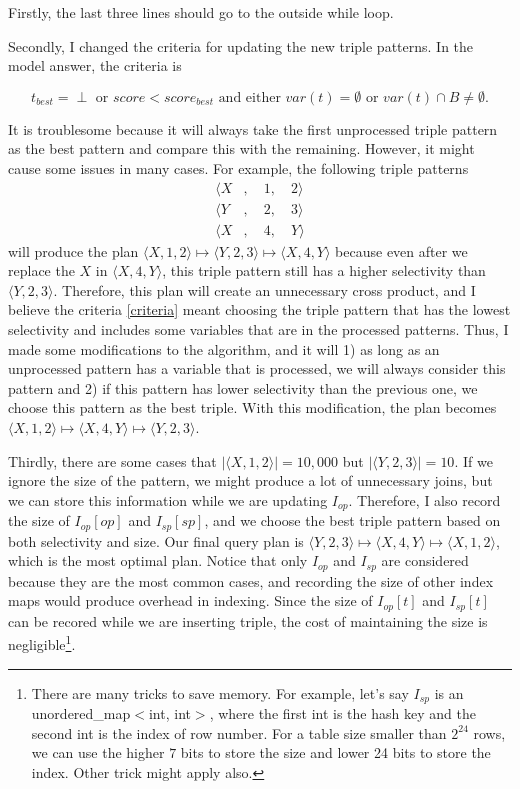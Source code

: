 \documentclass{article}
\begin{document}
\begin{enumerate}
\begin{enumerate}
Firstly, the last three lines should go to the outside while loop. 


Secondly, I changed the criteria for updating the new triple patterns. In the model answer, the criteria is 

\begin{equation}\label{criteria}
	t_{best} = \perp \text{ or } score < score_{best} \text{ and either } var(t) = \emptyset \text{ or } var(t) \cap B \neq \emptyset.
\end{equation}

It is troublesome because it will always take the first unprocessed triple pattern as the best pattern and compare this with the remaining. However, it might cause some issues in many cases. For example, the following triple patterns 
\begin{align*}
	\langle X &,\quad 1,\quad 2\rangle \\
	\langle Y &,\quad 2,\quad 3\rangle\\
	\langle X &,\quad 4,\quad Y\rangle
\end{align*}
will produce the plan $\langle X, 1, 2\rangle \mapsto \langle Y, 2, 3\rangle \mapsto \langle X, 4, Y\rangle$ because even after we replace the $X$ in $\langle X, 4, Y\rangle$, this triple pattern still has a higher selectivity than $\langle Y, 2, 3\rangle$. Therefore, this plan will create an unnecessary cross product, and I believe the criteria \eqref{criteria} meant choosing the triple pattern that has the lowest selectivity and includes some variables that are in the processed patterns. Thus, I made some modifications to the algorithm, and it will 1) as long as an unprocessed pattern has a variable that is processed, we will always consider this pattern and 2) if this pattern has lower selectivity than the previous one, we choose this pattern as the best triple. With this modification, the plan becomes $\langle X, 1, 2\rangle \mapsto \langle X, 4, Y\rangle \mapsto \langle Y, 2, 3\rangle$. 

Thirdly, there are some cases that $|\langle X, 1, 2\rangle| = 10,000$ but $|\langle Y, 2, 3\rangle| = 10$. If we ignore the size of the pattern, we might produce a lot of unnecessary joins, but we can store this information while we are updating $I_{op}$. Therefore, I also record the size of $I_{op}[op]$ and $I_{sp}[sp]$, and we choose the best triple pattern based on both selectivity and size. Our final query plan is $\langle Y, 2, 3\rangle \mapsto \langle X, 4, Y\rangle \mapsto \langle X, 1, 2\rangle$, which is the most optimal plan. Notice that only $I_{op}$ and $I_{sp}$ are considered because they are the most common cases, and recording the size of other index maps would produce overhead in indexing. Since the size of $I_{op}[t]$ and $I_{sp}[t]$ can be recored while we are inserting triple, the cost of maintaining the size is negligible\footnote{There are many tricks to save memory. For example, let's say $I_{sp}$ is an unordered\_map$<$int, int$>$, where the first int is the hash key and the second int is the index of row number. For a table size smaller than $2^{24}$ rows, we can use the higher $7$ bits to store the size and lower 24 bits to store the index. Other trick might apply also.}. 


\end{enumerate}
\end{enumerate}
\end{document}
